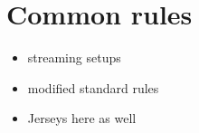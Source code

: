 \section{Common rules}
\label{sec:Common_rules}

\begin{itemize}
    \item streaming setups
    \item modified standard rules
    \item Jerseys here as well
\end{itemize}